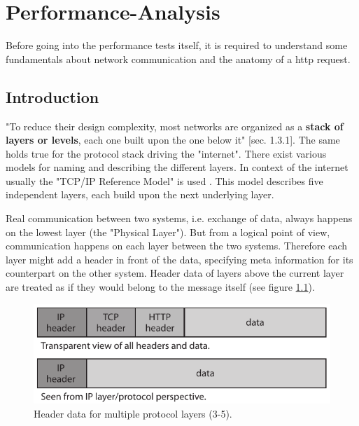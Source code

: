 \chapter{Performance-Analysis}

Before going into the performance tests itself, it is required to understand some fundamentals about network communication and the anatomy of a \gls{http} request.
\\

\section{Introduction}

"To reduce their design complexity, most networks are organized as a \textbf{stack of layers or levels}, each one built upon the one below it" \cite{kn1}[sec. 1.3.1]. The same holds true for the protocol stack driving the "internet". There exist various models for naming and describing the different layers. In context of the internet usually the "TCP/IP Reference Model" is used \cite{kn1}. This model describes five independent layers, each build upon the next underlying layer. 

Real communication between two systems, i.e. exchange of data, always happens on the lowest layer (the "Physical Layer"). But from a logical point of view, communication happens on each layer between the two systems. Therefore each layer might add a header in front of the data, specifying meta information for its counterpart on the other system. Header data of layers above the current layer are treated as if they would belong to the message itself (see figure \ref{fig:header-layers}).

\begin{figure}[H]
	\centering
	\includegraphics[scale=1]{images/protocol-headers.pdf}
	\caption{Header data for multiple protocol layers (3-5).}
	\label{fig:header-layers}
\end{figure}

